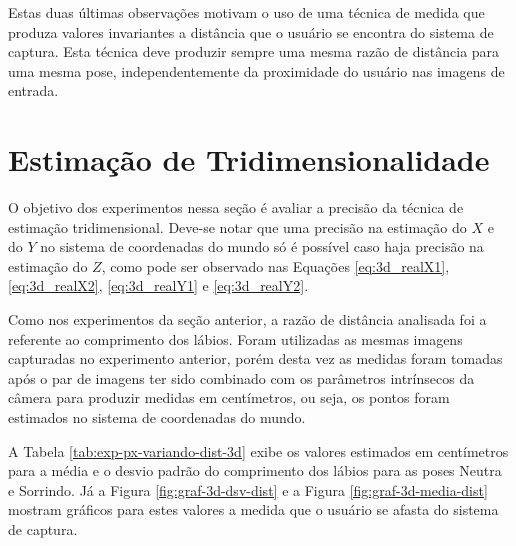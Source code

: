 Estas duas últimas observações motivam o uso de uma técnica de medida que produza valores invariantes a distância que o usuário se encontra do sistema de captura. Esta técnica deve produzir sempre uma mesma razão de distância para uma mesma pose, independentemente da proximidade do usuário nas imagens de entrada.

\section{Estimação de Tridimensionalidade	}

O objetivo dos experimentos nessa seção é avaliar a precisão da técnica de estimação tridimensional. Deve-se notar que uma precisão na estimação do $X$ e do $Y$ no sistema de coordenadas do mundo só é possível caso haja precisão na estimação do $Z$, como pode ser observado nas Equações \ref{eq:3d_realX1}, \ref{eq:3d_realX2}, \ref{eq:3d_realY1} e \ref{eq:3d_realY2}.

Como nos experimentos da seção anterior, a razão de distância analisada foi a referente ao comprimento dos lábios. Foram utilizadas as mesmas imagens capturadas no experimento anterior, porém desta vez as medidas foram tomadas após o par de imagens ter sido combinado com os parâmetros intrínsecos da câmera para produzir medidas em centímetros, ou seja, os pontos foram estimados no sistema de coordenadas do mundo.

A Tabela \ref{tab:exp-px-variando-dist-3d} exibe os valores estimados em centímetros para a média e o desvio padrão do comprimento dos lábios para as poses Neutra e Sorrindo. Já a Figura \ref{fig:graf-3d-dsv-dist} e a Figura \ref{fig:graf-3d-media-dist} mostram gráficos para estes valores a medida que o usuário se afasta do sistema de captura.


